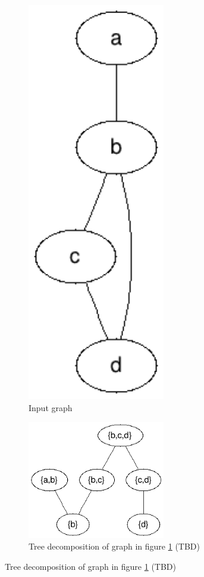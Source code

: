 \documentclass[a4paper,11pt]{report}
\theoremstyle{plain}
\theoremstyle{definition}
\begin{document}
\begin{figure}[here]
\centering
\begin{subfigure}[b]{\linewidth}
\centering
\includegraphics[width=6cm]{images/input_graph.png} 
\caption[Graph]{Input graph}
\label{fig:arbitrary-graph}
\end{subfigure}
\begin{subfigure}[b]{\linewidth}
\centering
\includegraphics[width=6cm]{images/nice_tree_decomp.png} 
\caption[Decomposition]{Tree decomposition of graph in figure \ref{fig:arbitrary-graph} (TBD)}
\label{fig:decomp-graph}
\end{subfigure}
\end{figure}
\end{document}

